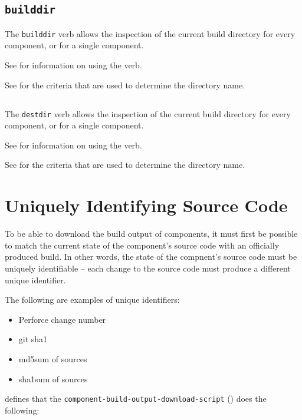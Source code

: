 \subsection{\texttt{builddir}}

The \lmsbw \texttt{builddir} verb allows the inspection of
the current build directory for every component, or for a single
component.

See  for information on using the verb.

See  for the criteria that are used to
determine the directory name.

\subsection{\destdir}
The \lmsbw \texttt{destdir} verb allows the inspection of
the current build directory for every component, or for a single
component.

See  for information on using the verb.

See  for the criteria that are used
to determine the directory name.

\section{Uniquely Identifying Source Code}
\label{tips:uniquely-identify-source-code}

To be able to download the build output of components, it must first
be possible to match the current state of the component's source code
with an officially produced build.  In other words, the state of the
compnent's source code must be uniquely identifiable -- each change to
the source code must produce a different unique identifier.

The following are examples of unique identifiers:

\begin{itemize}
\item{Perforce change number}
\item{git sha1}
\item{md5sum of sources}
\item{sha1sum of sources}
\end{itemize}

\lmsbw defines that the
\texttt{component-build-output-download-script}
() does the
following:


